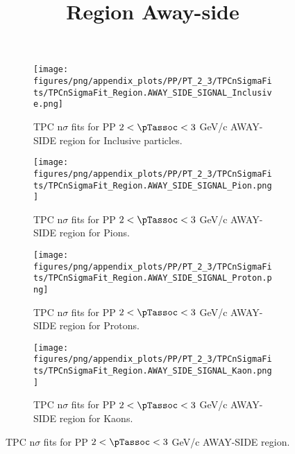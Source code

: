             \begin{figure}[H]
                \title{Region Away-side}
                \begin{subfigure}[b]{0.5\textwidth}
                    \centering
                    \texttt{[image: figures/png/appendix\_plots/PP/PT\_2\_3/TPCnSigmaFits/TPCnSigmaFit\_Region.AWAY\_SIDE\_SIGNAL\_Inclusive.png]}
                    \caption{TPC n$\sigma$ fits for PP $2 < \pTassoc < 3$ GeV/c AWAY-SIDE region for Inclusive particles.}
                    \label{fig:appendix_PP_$2 < \pTassoc < 3$ GeV/c_AWAY_SIDE_SIGNAL_Inclusive}
                \end{subfigure}
                \begin{subfigure}[b]{0.5\textwidth}
                    \centering
                    \texttt{[image: figures/png/appendix\_plots/PP/PT\_2\_3/TPCnSigmaFits/TPCnSigmaFit\_Region.AWAY\_SIDE\_SIGNAL\_Pion.png]}
                    \caption{TPC n$\sigma$ fits for PP $2 < \pTassoc < 3$ GeV/c AWAY-SIDE region for Pions.}
                    \label{fig:appendix_PP_$2 < \pTassoc < 3$ GeV/c_AWAY_SIDE_SIGNAL_Pion}
                \end{subfigure}
                \begin{subfigure}[b]{0.5\textwidth}
                    \centering
                    \texttt{[image: figures/png/appendix\_plots/PP/PT\_2\_3/TPCnSigmaFits/TPCnSigmaFit\_Region.AWAY\_SIDE\_SIGNAL\_Proton.png]}
                    \caption{TPC n$\sigma$ fits for PP $2 < \pTassoc < 3$ GeV/c AWAY-SIDE region for Protons.}
                    \label{fig:appendix_PP_$2 < \pTassoc < 3$ GeV/c_AWAY_SIDE_SIGNAL_Proton}
                \end{subfigure}
                \begin{subfigure}[b]{0.5\textwidth}
                    \centering
                    \texttt{[image: figures/png/appendix\_plots/PP/PT\_2\_3/TPCnSigmaFits/TPCnSigmaFit\_Region.AWAY\_SIDE\_SIGNAL\_Kaon.png]}
                    \caption{TPC n$\sigma$ fits for PP $2 < \pTassoc < 3$ GeV/c AWAY-SIDE region for Kaons.}
                    \label{fig:appendix_PP_$2 < \pTassoc < 3$ GeV/c_AWAY_SIDE_SIGNAL_Kaon}
                \end{subfigure}
                \caption{TPC n$\sigma$ fits for PP $2 < \pTassoc < 3$ GeV/c AWAY-SIDE region.}
                \label{fig:appendix_PP_$2 < \pTassoc < 3$ GeV/c_AWAY_SIDE_SIGNAL}
            \end{figure}
